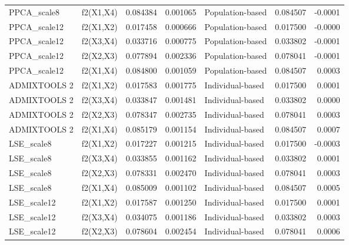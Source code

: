 \begin{tabular}{llrrlrr}
 PPCA\_scale8 &       f2(X1,X4) & 0.084384 &        0.001065 &                     Population-based &    0.084507 & -0.0001 \\
PPCA\_scale12 &       f2(X1,X2) & 0.017458 &        0.000666 &                     Population-based &    0.017500 & -0.0000 \\
PPCA\_scale12 &       f2(X3,X4) & 0.033716 &        0.000775 &                     Population-based &    0.033802 & -0.0001 \\
PPCA\_scale12 &       f2(X2,X3) & 0.077894 &        0.002336 &                     Population-based &    0.078041 & -0.0001 \\
PPCA\_scale12 &       f2(X1,X4) & 0.084800 &        0.001059 &                     Population-based &    0.084507 &  0.0003 \\
ADMIXTOOLS 2 &       f2(X1,X2) & 0.017583 &        0.001775 &                     Individual-based &    0.017500 &  0.0001 \\
ADMIXTOOLS 2 &       f2(X3,X4) & 0.033847 &        0.001481 &                     Individual-based &    0.033802 &  0.0000 \\
ADMIXTOOLS 2 &       f2(X2,X3) & 0.078347 &        0.002735 &                     Individual-based &    0.078041 &  0.0003 \\
ADMIXTOOLS 2 &       f2(X1,X4) & 0.085179 &        0.001154 &                     Individual-based &    0.084507 &  0.0007 \\
  LSE\_scale8 &       f2(X1,X2) & 0.017227 &        0.001215 &                     Individual-based &    0.017500 & -0.0003 \\
  LSE\_scale8 &       f2(X3,X4) & 0.033855 &        0.001162 &                     Individual-based &    0.033802 &  0.0001 \\
  LSE\_scale8 &       f2(X2,X3) & 0.078331 &        0.002470 &                     Individual-based &    0.078041 &  0.0003 \\
  LSE\_scale8 &       f2(X1,X4) & 0.085009 &        0.001102 &                     Individual-based &    0.084507 &  0.0005 \\
 LSE\_scale12 &       f2(X1,X2) & 0.017587 &        0.001250 &                     Individual-based &    0.017500 &  0.0001 \\
 LSE\_scale12 &       f2(X3,X4) & 0.034075 &        0.001186 &                     Individual-based &    0.033802 &  0.0003 \\
 LSE\_scale12 &       f2(X2,X3) & 0.078604 &        0.002454 &                     Individual-based &    0.078041 &  0.0006 \\

\end{tabular}
